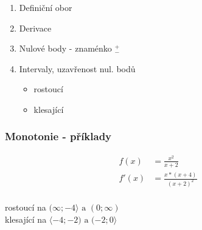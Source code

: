 \begin{enumerate}
  \item Definiční obor
  \item Derivace
  \item Nulové body - znaménko $^+_-$
  \item Intervaly, uzavřenost nul. bodů
    \begin{itemize}
      \item rostoucí
      \item klesající
    \end{itemize}
\end{enumerate}
\subsubsection{Monotonie - příklady}
\begin{align*}
  f(x)&=\frac{x^2}{x+2} \\
  f'(x)&=\frac{x*(x+4)}{(x+2)^2} \\
\end{align*}
\begin{center}
  rostoucí na $(\infty;-4\rangle \text{ a } (0;\infty)$ \\
  klesající na $\langle-4;-2) \text{ a } (-2;0\rangle$
\end{center}

